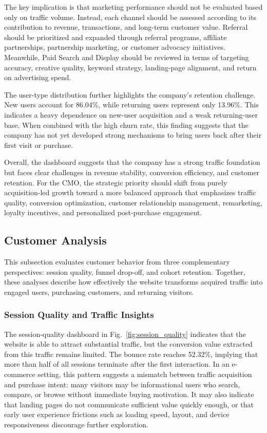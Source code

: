 \documentclass[conference]{IEEEtran}
\begin{document}
The key implication is that marketing performance should not be evaluated based only on traffic volume. Instead, each channel should be assessed according to its contribution to revenue, transactions, and long-term customer value. Referral should be prioritized and expanded through referral programs, affiliate partnerships, partnership marketing, or customer advocacy initiatives. Meanwhile, Paid Search and Display should be reviewed in terms of targeting accuracy, creative quality, keyword strategy, landing-page alignment, and return on advertising spend.

The user-type distribution further highlights the company's retention challenge. New users account for 86.04\%, while returning users represent only 13.96\%. This indicates a heavy dependence on new-user acquisition and a weak returning-user base. When combined with the high churn rate, this finding suggests that the company has not yet developed strong mechanisms to bring users back after their first visit or purchase.

Overall, the dashboard suggests that the company has a strong traffic foundation but faces clear challenges in revenue stability, conversion efficiency, and customer retention. For the CMO, the strategic priority should shift from purely acquisition-led growth toward a more balanced approach that emphasizes traffic quality, conversion optimization, customer relationship management, remarketing, loyalty incentives, and personalized post-purchase engagement.

\subsection{Customer Analysis}

This subsection evaluates customer behavior from three complementary perspectives: session quality, funnel drop-off, and cohort retention. Together, these analyses describe how effectively the website transforms acquired traffic into engaged users, purchasing customers, and returning visitors.

\subsubsection{Session Quality and Traffic Insights}

The session-quality dashboard in Fig.~\ref{fig:session_quality} indicates that the website is able to attract substantial traffic, but the conversion value extracted from this traffic remains limited. The bounce rate reaches 52.32\%, implying that more than half of all sessions terminate after the first interaction. In an e-commerce setting, this pattern suggests a mismatch between traffic acquisition and purchase intent: many visitors may be informational users who search, compare, or browse without immediate buying motivation. It may also indicate that landing pages do not communicate sufficient value quickly enough, or that early user experience frictions such as loading speed, layout, and device responsiveness discourage further exploration.
\end{document}
